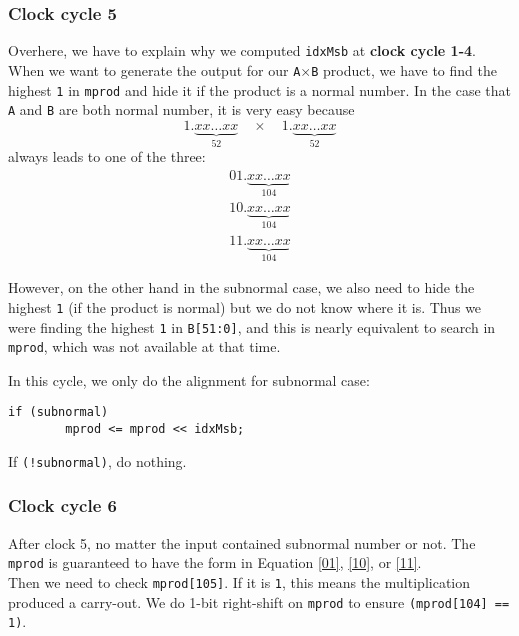 \documentclass{article}
\begin{document}
            \subsubsection*{Clock cycle 5}
                Overhere, we have to explain why we computed {\tt idxMsb} at {\bf clock cycle 1-4}.
                When we want to generate the output for our {\tt A}$\times${\tt B} product, 
                we have to find the highest {\tt 1} in {\tt mprod} and hide it if the product is a normal number.
                In the case that {\tt A} and {\tt B} are both normal number, it is very easy because
                \[
                    1.\underbrace{xx\dotsc xx}_{52} \quad\times\quad 1.\underbrace{xx\dotsc xx}_{52}
                \]
                always leads to one of the three:
                \begin{align}
                    01.\underbrace{xx\dotsc xx}_{104} \label{01}\\
                    10.\underbrace{xx\dotsc xx}_{104} \label{10}\\
                    11.\underbrace{xx\dotsc xx}_{104} \label{11}
                \end{align}

                However, on the other hand in the subnormal case, we also need to hide the highest {\tt 1} (if the product is normal) but we do not know where it is.
                Thus we were finding the highest {\tt 1} in {\tt B[51:0]}, and this is nearly equivalent to search in {\tt mprod}, which was not available at that time.

                In this cycle, we only do the alignment for subnormal case:
                \begin{lstlisting}[style = verilog-style]
    if (subnormal)
        mprod <= mprod << idxMsb;
                \end{lstlisting}

                If {\tt (!subnormal)}, do nothing.
                
            \subsubsection*{Clock cycle 6}
                After clock 5, no matter the input contained subnormal number or not. The {\tt mprod} is guaranteed to have the form in Equation \eqref{01}, \eqref{10}, or \eqref{11}. \\
                Then we need to check {\tt mprod[105]}. If it is {\tt 1}, this means the multiplication produced a carry-out. 
                We do 1-bit right-shift on {\tt mprod} to ensure {\tt (mprod[104] == 1)}. 
\end{document}
